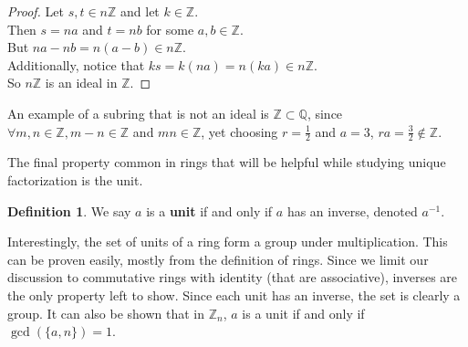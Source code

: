 \documentclass[11pt]{amsart}
\theoremstyle{definition}
\newtheorem{definition}[theorem]{Definition}
\newcommand{\rationals}{\mathbb{Q}}
\newcommand{\integers}{\mathbb{Z}}
\begin{document}
\begin{proof}
	Let $s, t \in n\integers$ and let $k \in \integers$. \\
	Then $s = na$ and $t = nb$ for some $a, b \in \integers$. \\
	But $na - nb = n(a - b) \in n\integers$. \\
	Additionally, notice that $ks = k(na) = n(ka) \in n\integers$. \\
	So $n\integers$ is an ideal in $\integers$.
\end{proof}
An example of a subring that is not an ideal is $\integers \subset \rationals$, since $\forall m, n \in \integers, m - n \in \integers$ and 
$mn \in \integers$, yet choosing $r = \frac{1}{2}$ and $a = 3$, $ra = \frac{3}{2} \notin \integers$.
\newline

The final property common in rings that will be helpful while studying unique factorization is the unit.
\begin{definition}
	We say $a$ is a \textbf{unit} if and only if $a$ has an inverse, denoted $a^{-1}$.
\end{definition}
Interestingly, the set of units of a ring form a group under multiplication. This can be proven easily, mostly from the definition of rings. Since we
limit our discussion to commutative rings with identity (that are associative), inverses are the only property left to show. Since each unit has an
inverse, the set is clearly a group. It can also be shown that in $\integers_{n}$, $a$ is a unit if and only if $\gcd(\{ a, n \}) = 1$.
\newpage
\end{document}
